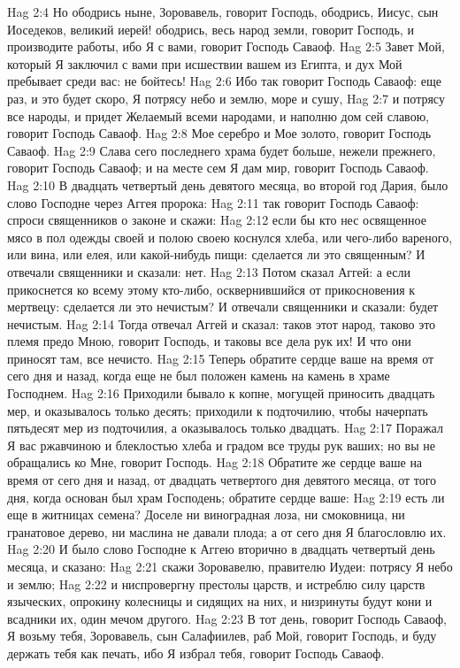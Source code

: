 \vs Hag 2:4 Но ободрись ныне, Зоровавель, говорит Господь, ободрись, Иисус, сын Иоседеков, великий иерей! ободрись, весь народ земли, говорит Господь, и производите работы, ибо Я с вами, говорит Господь Саваоф.
\vs Hag 2:5 Завет Мой, который Я заключил с вами при исшествии вашем из Египта, и дух Мой пребывает среди вас: не бойтесь!
\vs Hag 2:6 Ибо так говорит Господь Саваоф: еще раз, и это будет скоро, Я потрясу небо и землю, море и сушу,
\vs Hag 2:7 и потрясу все народы, и придет Желаемый всеми народами, и наполню дом сей славою, говорит Господь Саваоф.
\vs Hag 2:8 Мое серебро и Мое золото, говорит Господь Саваоф.
\vs Hag 2:9 Слава сего последнего храма будет больше, нежели прежнего, говорит Господь Саваоф; и на месте сем Я дам мир, говорит Господь Саваоф.
\rsbpar\vs Hag 2:10 В двадцать четвертый день девятого месяца, во второй год Дария, было слово Господне через Аггея пророка:
\vs Hag 2:11 так говорит Господь Саваоф: спроси священников о законе и скажи:
\vs Hag 2:12 если бы кто нес освященное мясо в пол одежды своей и полою своею коснулся хлеба, или чего-либо вареного, или вина, или елея, или какой-нибудь пищи: сделается ли это священным? И отвечали священники и сказали: нет.
\vs Hag 2:13 Потом сказал Аггей: а если прикоснется ко всему этому кто-либо, осквернившийся от прикосновения к мертвецу: сделается ли это нечистым? И отвечали священники и сказали: будет нечистым.
\vs Hag 2:14 Тогда отвечал Аггей и сказал: таков этот народ, таково это племя предо Мною, говорит Господь, и таковы все дела рук их! И что они приносят там, все нечисто.
\vs Hag 2:15 Теперь обратите сердце ваше на время от сего дня и назад, когда еще не был положен камень на камень в храме Господнем.
\vs Hag 2:16 Приходили бывало к копне, могущей приносить двадцать мер, и оказывалось только десять; приходили к подточилию, чтобы начерпать пятьдесят мер из подточилия, а оказывалось только двадцать.
\vs Hag 2:17 Поражал Я вас ржавчиною и блеклостью хлеба и градом все труды рук ваших; но вы не обращались ко Мне, говорит Господь.
\vs Hag 2:18 Обратите же сердце ваше на время от сего дня и назад, от двадцать четвертого дня девятого месяца, от того дня, когда основан был храм Господень; обратите сердце ваше:
\vs Hag 2:19 есть ли еще в житницах семена? Доселе ни виноградная лоза, ни смоковница, ни гранатовое дерево, ни маслина не давали плода; а от сего дня Я благословлю их.
\rsbpar\vs Hag 2:20 И было слово Господне к Аггею вторично в двадцать четвертый день месяца, и сказано:
\vs Hag 2:21 скажи Зоровавелю, правителю Иудеи: потрясу Я небо и землю;
\vs Hag 2:22 и ниспровергну престолы царств, и истреблю силу царств языческих, опрокину колесницы и сидящих на них, и низринуты будут кони и всадники их, один мечом другого.
\vs Hag 2:23 В тот день, говорит Господь Саваоф, Я возьму тебя, Зоровавель, сын Салафиилев, раб Мой, говорит Господь, и буду держать тебя как печать, ибо Я избрал тебя, говорит Господь Саваоф.
